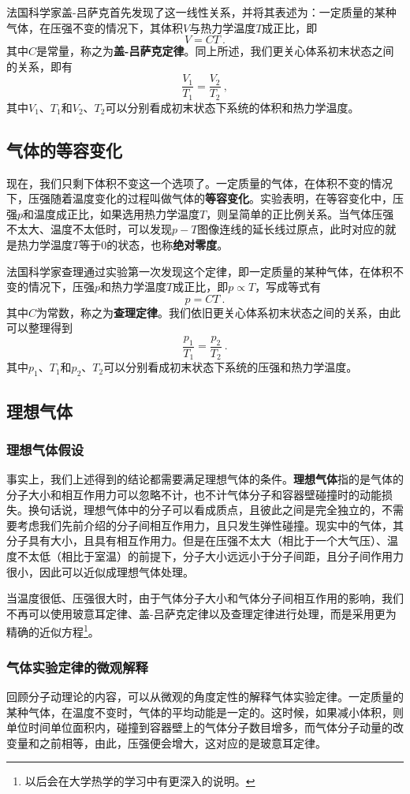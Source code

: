 法国科学家盖-吕萨克首先发现了这一线性关系，并将其表述为：一定质量的某种气体，在压强不变的情况下，其体积$V$与热力学温度$T$成正比，即
$$V=CT~.$$
其中$C$是常量，称之为\textbf{盖-吕萨克定律}。同上所述，我们更关心体系初末状态之间的关系，即有$$\dfrac{V_1}{T_1}=\dfrac{V_2}{T_2}~,$$
其中$V_1$、$T_1$和$V_2$、$T_2$可以分别看成初末状态下系统的体积和热力学温度。

\subsection{气体的等容变化} 
现在，我们只剩下体积不变这一个选项了。一定质量的气体，在体积不变的情况下，压强随着温度变化的过程叫做气体的\textbf{等容变化}。实验表明，在等容变化中，压强$p$和温度成正比，如果选用热力学温度$T$，则呈简单的正比例关系。当气体压强不太大、温度不太低时，可以发现$p-T$图像连线的延长线过原点，此时对应的就是热力学温度$T$等于$0$的状态，也称\textbf{绝对零度}。

法国科学家查理通过实验第一次发现这个定律，即一定质量的某种气体，在体积不变的情况下，压强$p$和热力学温度$T$成正比，即$p\propto T$，写成等式有
$$p=CT~.$$
其中$C$为常数，称之为\textbf{查理定律}。我们依旧更关心体系初末状态之间的关系，由此可以整理得到$$\dfrac{p_1}{T_1}=\dfrac{p_2}{T_2}~.$$
其中$p_1$、$T_1$和$p_2$、$T_2$可以分别看成初末状态下系统的压强和热力学温度。

\subsection{理想气体}
\subsubsection{理想气体假设}
事实上，我们上述得到的结论都需要满足理想气体的条件。\textbf{理想气体}指的是气体的分子大小和相互作用力可以忽略不计，也不计气体分子和容器壁碰撞时的动能损失。换句话说，理想气体中的分子可以看成质点，且彼此之间是完全独立的，不需要考虑我们先前介绍的分子间相互作用力，且只发生弹性碰撞。现实中的气体，其分子具有大小，且具有相互作用力。但是在压强不太大（相比于一个大气压）、温度不太低（相比于室温）的前提下，分子大小远远小于分子间距，且分子间作用力很小，因此可以近似成理想气体处理。

当温度很低、压强很大时，由于气体分子大小和气体分子间相互作用的影响，我们不再可以使用玻意耳定律、盖-吕萨克定律以及查理定律进行处理，而是采用更为精确的近似方程\footnote{以后会在大学热学的学习中有更深入的说明。}。

\subsubsection{气体实验定律的微观解释}
 回顾分子动理论的内容，可以从微观的角度定性的解释气体实验定律。一定质量的某种气体，在温度不变时，气体的平均动能是一定的。这时候，如果减小体积，则单位时间单位面积内，碰撞到容器壁上的气体分子数目增多，而气体分子动量的改变量和之前相等，由此，压强便会增大，这对应的是玻意耳定律。

